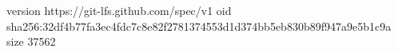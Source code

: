 version https://git-lfs.github.com/spec/v1
oid sha256:32df4b77fa3ec4fdc7c8e82f2781374553d1d374bb5eb830b89f947a9e5b1c9a
size 37562
